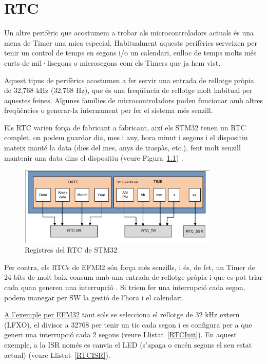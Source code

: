 \chapter{RTC}
\label{sub:RTC}

Un altre perifèric que acostumem a trobar als microcontroladors actuals és una mena de \gls{Timer} una mica especial. Habitualment aquests perifèrics serveixen per tenir un control de temps en segons i/o un calendari, enlloc de temps molts més curts de mil·lisegons o microsegons com els Timers que ja hem vist.

Aquest tipus de perifèrics acostumen a fer servir una entrada de rellotge pròpia de 32,768 kHz (32.768 Hz), que és una freqüència de rellotge molt habitual per aquestes feines. Algunes famílies de microcontroladors poden funcionar amb altres freqüències o generar-la internament per fer el sistema més senzill.

Els RTC varien força de fabricant a fabricant, així els STM32 tenen un RTC complet, on podem guardar dia, mes i any, hora minut i segons i el dispositiu mateix manté la data (dies del mes, anys de traspàs, etc.), fent molt senzill mantenir una data dins el dispositiu (veure Figura~\ref{fig:STRTC}) \cite[799]{STM32F4RM}.

\begin{figure}
 \centering
 \includegraphics[width=0.85\textwidth, keepaspectratio]{imatges/RTC_STM32.png}
 \caption{Registres del RTC de STM32 \cite{ST_AN3371}}
 \label{fig:STRTC}
\end{figure}

Per contra, els RTCs de EFM32 són força més senzills, i és, de fet, un Timer de 24 bits de molt baix consum amb una entrada de rellotge pròpia i que es pot triar cada quan generen una interrupció \cite[285]{EFM32GRM}. Si triem fer una interrupció cada segon, podem manegar per SW la gestió de l'hora i el calendari.

\href{https://github.com/mariusmm/cursembedded/tree/master/Simplicity/RTC}{A l'exemple per EFM32} tant sols se selecciona el rellotge de 32 kHz extern (LFXO), el divisor a 32768 per tenir un tic cada segon i es configura per a que generi una interrupció cada 2 segons (veure Llistat~\ref{RTCInit}). En aquest exemple, a la \gls{ISR} només es canvia el LED (s'apaga o encén segons el seu estat actual) (veure Llistat~\ref{RTCISR}).

